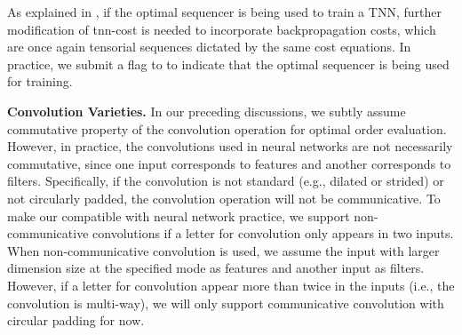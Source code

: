 As explained in , if the optimal sequencer is being used to train a TNN, further modification of \textsf{tnn-cost} is needed to incorporate backpropagation costs, which are once again tensorial sequences dictated by the same cost equations. In practice, we submit a flag to \conveinsum to indicate that the optimal sequencer is being used for training. 

\textbf{Convolution Varieties.}
In our preceding discussions, we subtly assume commutative property of the convolution operation for optimal order evaluation. However, in practice, the convolutions used in neural networks are not necessarily commutative, since one input corresponds to features and another corresponds to filters. Specifically, if the convolution is not standard (e.g., dilated or strided) or not circularly padded, the convolution operation will not be communicative.
To make our \opentnn compatible with neural network practice, we support non-communicative convolutions if a letter for convolution only appears in two inputs. When non-communicative convolution is used, we assume the input with larger dimension size at the specified mode as features and another input as filters. 
However, if a letter for convolution appear more than twice in the inputs (i.e., the convolution is multi-way), we will only support communicative convolution with circular padding for now.
